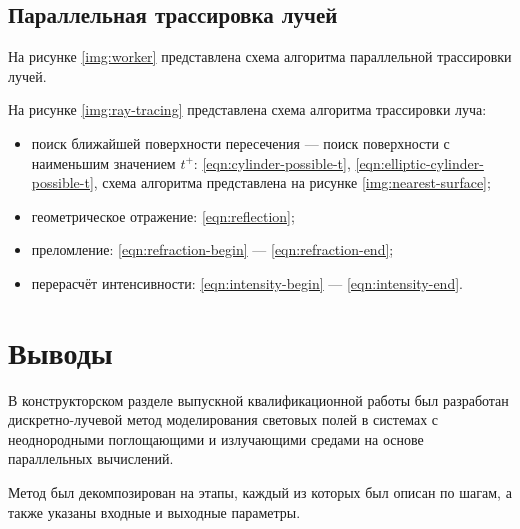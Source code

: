 \subsection{Параллельная трассировка лучей}

На рисунке \ref{img:worker} представлена схема алгоритма параллельной трассировки лучей.


На рисунке \ref{img:ray-tracing} представлена схема алгоритма трассировки луча:
\begin{itemize}
	\item поиск ближайшей поверхности пересечения — поиск поверхности с наименьшим значением $t^+$: \eqref{eqn:cylinder-possible-t}, \eqref{eqn:elliptic-cylinder-possible-t}, схема алгоритма представлена на рисунке \ref{img:nearest-surface};
	\item геометрическое отражение: \eqref{eqn:reflection};
	\item преломление: \eqref{eqn:refraction-begin} — \eqref{eqn:refraction-end};
	\item перерасчёт интенсивности: \eqref{eqn:intensity-begin} — \eqref{eqn:intensity-end}.
\end{itemize}



\section*{Выводы}

В конструкторском разделе выпускной квалификационной работы был разработан дискретно-лучевой метод моделирования световых полей в системах с неоднородными поглощающими и излучающими средами на основе параллельных вычислений.

Метод был декомпозирован на этапы, каждый из которых был описан по шагам, а также указаны входные и выходные параметры.

